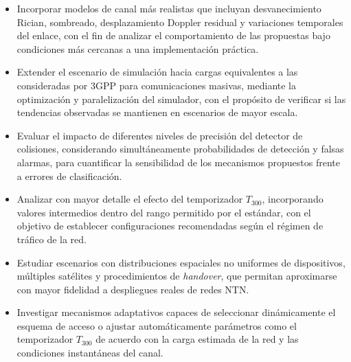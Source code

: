 \begin{itemize}

\item Incorporar modelos de canal más realistas que incluyan desvanecimiento Rician, sombreado, desplazamiento Doppler residual y variaciones temporales del enlace, con el fin de analizar el comportamiento de las propuestas bajo condiciones más cercanas a una implementación práctica.

\item Extender el escenario de simulación hacia cargas equivalentes a las consideradas por 3GPP para comunicaciones masivas, mediante la optimización y paralelización del simulador, con el propósito de verificar si las tendencias observadas se mantienen en escenarios de mayor escala.

\item Evaluar el impacto de diferentes niveles de precisión del detector de colisiones, considerando simultáneamente probabilidades de detección y falsas alarmas, para cuantificar la sensibilidad de los mecanismos propuestos frente a errores de clasificación.

\item Analizar con mayor detalle el efecto del temporizador $T_{300}$, incorporando valores intermedios dentro del rango permitido por el estándar, con el objetivo de establecer configuraciones recomendadas según el régimen de tráfico de la red.

\item Estudiar escenarios con distribuciones espaciales no uniformes de dispositivos, múltiples satélites y procedimientos de \textit{handover}, que permitan aproximarse con mayor fidelidad a despliegues reales de redes NTN.

\item Investigar mecanismos adaptativos capaces de seleccionar dinámicamente el esquema de acceso o ajustar automáticamente parámetros como el temporizador $T_{300}$ de acuerdo con la carga estimada de la red y las condiciones instantáneas del canal.

\end{itemize}
